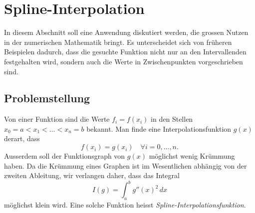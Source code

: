 %
%
%
\section{Spline-Interpolation
\label{buch:nichtdiff:section:splines}}
In diesem Abschnitt soll eine Anwendung diskutiert werden, die grossen
Nutzen in der numerischen Mathematik bringt.
Es unterscheidet sich von früheren Beispielen dadurch, dass die
gesuchte Funktion nicht nur an den Intervallenden festgehalten wird,
sondern auch die Werte in Zwischenpunkten vorgeschrieben sind.

%
%
\subsection{Problemstellung}
Von einer Funktion sind die Werte 
$f_i=f(x_i)$ in den Stellen $x_0=a<x_1<\dots<x_n=b$ bekannt.
Man finde eine Interpolationsfunktion $g(x)$ derart, dass
\[
f(x_i) = g(x_i)
\quad
\forall i=0,\dots,n.
\]
Ausserdem soll der Funktionsgraph von $g(x)$ möglichst wenig Krümmung haben.
Da die Krümmung eines Graphen ist im Wesentlichen abhängig von der zweiten
Ableitung, wir verlangen daher, dass das Integral
\begin{equation}
I(g)
=
\int_a^b g''(x)^2\,dx
\label{buch:nichtdiff:spline:eqn:funktional}
\end{equation}
möglichst klein wird.
Eine solche Funktion heisst {\em Spline-Interpolationsfunktion}.

%
%
